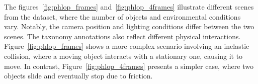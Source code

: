 \documentclass[conference]{IEEEtran}
\begin{document}
The figures~\ref{fig:phlop_frames} and~\ref{fig:phlop_4frames} illustrate different scenes from the dataset, where the number of objects and environmental conditions vary. Notably, the camera position and lighting conditions differ between the two scenes. The taxonomy annotations also reflect different physical interactions. Figure~\ref{fig:phlop_frames} shows a more complex scenario involving an inelastic collision, where a moving object interacts with a stationary one, causing it to move. In contrast, Figure~\ref{fig:phlop_4frames} presents a simpler case, where two objects slide and eventually stop due to friction.






\end{document}

